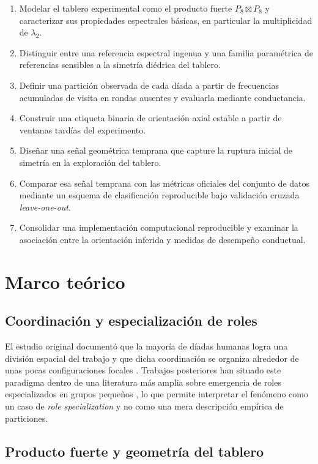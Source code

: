 \documentclass[journal]{IEEEtran}
\begin{document}
\begin{enumerate}
\item Modelar el tablero experimental como el producto fuerte $P_8 \boxtimes P_8$ y caracterizar sus propiedades espectrales básicas, en particular la multiplicidad de $\lambda_2$.
\item Distinguir entre una referencia espectral ingenua y una familia paramétrica de referencias sensibles a la simetría diédrica del tablero.
\item Definir una partición observada de cada díada a partir de frecuencias acumuladas de visita en rondas ausentes y evaluarla mediante conductancia.
\item Construir una etiqueta binaria de orientación axial estable a partir de ventanas tardías del experimento.
\item Diseñar una señal geométrica temprana que capture la ruptura inicial de simetría en la exploración del tablero.
\item Comparar esa señal temprana con las métricas oficiales del conjunto de datos mediante un esquema de clasificación reproducible bajo validación cruzada \emph{leave-one-out}.
\item Consolidar una implementación computacional reproducible y examinar la asociación entre la orientación inferida y medidas de desempeño conductual.
\end{enumerate}

\section{Marco teórico}\label{sec:marco}

\subsection{Coordinación y especialización de roles}

El estudio original documentó que la mayoría de díadas humanas logra una división espacial del trabajo y que dicha coordinación se organiza alrededor de unas pocas configuraciones focales \cite{andrade2021}. Trabajos posteriores han situado este paradigma dentro de una literatura más amplia sobre emergencia de roles especializados en grupos pequeños \cite{goldstone2024}, lo que permite interpretar el fenómeno como un caso de \emph{role specialization} y no como una mera descripción empírica de particiones.

\subsection{Producto fuerte y geometría del tablero}
\end{document}

